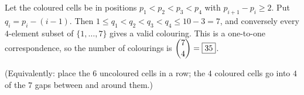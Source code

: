 Let the coloured cells be in positions $p_1<p_2<p_3<p_4$ with $p_{i+1}-p_i\ge2$. Put $q_i=p_i-(i-1)$. Then $1\le q_1<q_2<q_3<q_4\le10-3=7$, and conversely every $4$-element subset of $\{1,\dots,7\}$ gives a valid colouring. This is a one-to-one correspondence, so the number of colourings is $\dbinom74=\boxed{35}$.

(Equivalently: place the $6$ uncoloured cells in a row; the $4$ coloured cells go into $4$ of the $7$ gaps between and around them.)
